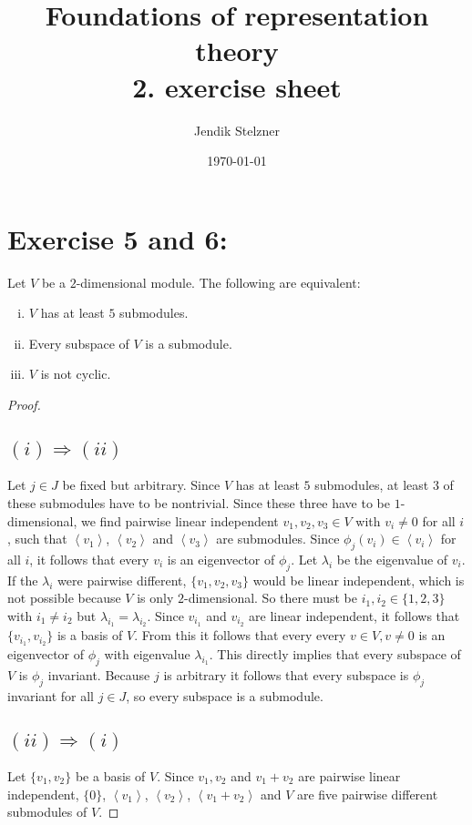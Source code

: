 \documentclass[a4paper,10pt]{article}
\title{Foundations of representation theory \\ 2. exercise sheet}
\author{Jendik Stelzner}
\date{\today}
\newcommand{\gen}[1]{\left\langle#1\right\rangle}
\begin{document}
\maketitle

\section*{Exercise 5 and 6:}
Let $V$ be a $2$-dimensional module. The following are equivalent:
\begin{enumerate}[(i)]
 \item $V$ has at least $5$ submodules.
 \item Every subspace of $V$ is a submodule.
 \item $V$ is not cyclic.
\end{enumerate}

\begin{proof}
\subsection*{$(i) \Rightarrow (ii)$}\addtocounter{section}{2}
Let $j \in J$ be fixed but arbitrary.
Since $V$ has at least $5$ submodules, at least $3$ of these submodules have to be nontrivial. Since these three have to be $1$-dimensional, we find pairwise linear independent $v_1, v_2, v_3 \in V$ with $v_i \neq 0$ for all $i$, such that $\gen{v_1}$, $\gen{v_2}$ and $\gen{v_3}$ are submodules. Since $\phi_j(v_i) \in \gen{v_i}$ for all $i$, it follows that every $v_i$ is an eigenvector of $\phi_j$. Let $\lambda_i$ be the eigenvalue of $v_i$. If the $\lambda_i$ were pairwise different, $\{v_1, v_2, v_3\}$ would be linear independent, which is not possible because $V$ is only $2$-dimensional. So there must be $i_1, i_2 \in \{1,2,3\}$ with $i_1 \neq i_2$ but $\lambda_{i_1} = \lambda_{i_2}$. Since $v_{i_1}$ and $v_{i_2}$ are linear independent, it follows that $\{v_{i_1}, v_{i_{2}}\}$ is a basis of $V$. From this it follows that every every $v \in V, v \neq 0$ is an eigenvector of $\phi_j$ with eigenvalue $\lambda_{i_1}$. This directly implies that every subspace of $V$ is $\phi_j$ invariant. Because $j$ is arbitrary it follows that every subspace is $\phi_j$ invariant for all $j \in J$, so every subspace is a submodule.

\subsection*{$(ii) \Rightarrow (i)$}
Let $\{v_1, v_2\}$ be a basis of $V$. Since $v_1, v_2$ and $v_1+v_2$ are pairwise linear independent, $\{0\}$, $\gen{v_1}$, $\gen{v_2}$, $\gen{v_1+v_2}$ and $V$ are five pairwise different submodules of $V$.


\end{proof}
\end{document}
